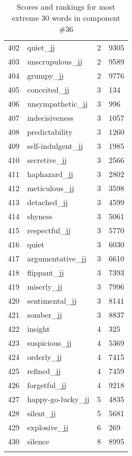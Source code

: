 \begin{longtable}[!htbp]{| rlr@{.}l |}
    402 & quiet\_jj & 2 & 9305 \\
    403 & unscrupulous\_jj & 2 & 9589 \\
    404 & grumpy\_jj & 2 & 9776 \\
    405 & conceited\_jj & 3 & 134 \\
    406 & unsympathetic\_jj & 3 & 996 \\
    407 & indecisiveness & 3 & 1057 \\
    408 & predictability & 3 & 1260 \\
    409 & self-indulgent\_jj & 3 & 1985 \\
    410 & secretive\_jj & 3 & 2566 \\
    411 & haphazard\_jj & 3 & 2802 \\
    412 & meticulous\_jj & 3 & 3598 \\
    413 & detached\_jj & 3 & 4599 \\
    414 & shyness & 3 & 5061 \\
    415 & respectful\_jj & 3 & 5770 \\
    416 & quiet & 3 & 6030 \\
    417 & argumentative\_jj & 3 & 6610 \\
    418 & flippant\_jj & 3 & 7393 \\
    419 & miserly\_jj & 3 & 7996 \\
    420 & sentimental\_jj & 3 & 8141 \\
    421 & somber\_jj & 3 & 8837 \\
    422 & insight & 4 & 325 \\
    423 & suspicious\_jj & 4 & 5369 \\
    424 & orderly\_jj & 4 & 7415 \\
    425 & refined\_jj & 4 & 7459 \\
    426 & forgetful\_jj & 4 & 9218 \\
    427 & happy-go-lucky\_jj & 5 & 4835 \\
    428 & silent\_jj & 5 & 5681 \\
    429 & explosive\_jj & 6 & 269 \\
    430 & silence & 8 & 8995 \\
    \hline
    \caption{Scores and rankings for most extreme 30 words in component \#36} \\
\end{longtable}
